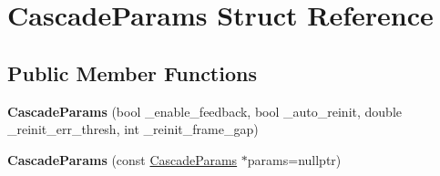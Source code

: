 \hypertarget{structCascadeParams}{\section{Cascade\-Params Struct Reference}
\label{structCascadeParams}
}
\subsection*{Public Member Functions}
\begin{DoxyCompactItemize}
\item 
\hypertarget{structCascadeParams_a62e31974b0b3a81c556cd8705b5e3841}{{\bfseries Cascade\-Params} (bool \-\_\-enable\-\_\-feedback, bool \-\_\-auto\-\_\-reinit, double \-\_\-reinit\-\_\-err\-\_\-thresh, int \-\_\-reinit\-\_\-frame\-\_\-gap)}\label{structCascadeParams_a62e31974b0b3a81c556cd8705b5e3841}

\item 
\hypertarget{structCascadeParams_ab6cb3cd34c90b755f0fc70e975bf407c}{{\bfseries Cascade\-Params} (const \hyperlink{structCascadeParams}{Cascade\-Params} $\ast$params=nullptr)}\label{structCascadeParams_ab6cb3cd34c90b755f0fc70e975bf407c}

\end{DoxyCompactItemize}
